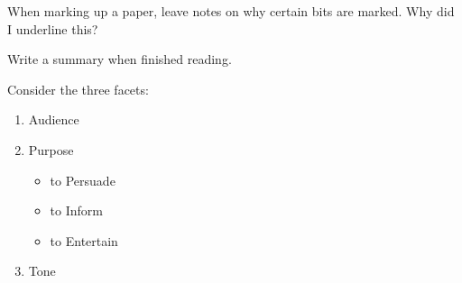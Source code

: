 \documentclass[12pt]{article}
\begin{document}
When marking up a paper, leave notes on why certain bits are marked.
Why did I underline this?

Write a summary when finished reading.

Consider the three facets:
\begin{enumerate}
    \item Audience
    \item Purpose
    \begin{itemize}
        \item to Persuade
        \item to Inform
        \item to Entertain
    \end{itemize}
    \item Tone
\end{enumerate}
\end{document}
